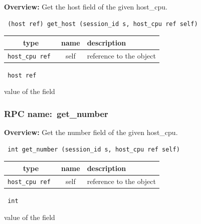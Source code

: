 {\bf Overview:} 
Get the host field of the given host\_cpu.

\begin{verbatim} (host ref) get_host (session_id s, host_cpu ref self)\end{verbatim}



 
\vspace{0.3cm}
\begin{tabular}{|c|c|p{7cm}|}
 \hline
{\bf type} & {\bf name} & {\bf description} \\ \hline
{\tt host\_cpu ref } & self & reference to the object \\ \hline 

\end{tabular}

\vspace{0.3cm}

{\tt 
host ref
}


value of the field
\vspace{0.3cm}
\vspace{0.3cm}
\vspace{0.3cm}
\subsubsection{RPC name:~get\_number}

{\bf Overview:} 
Get the number field of the given host\_cpu.

\begin{verbatim} int get_number (session_id s, host_cpu ref self)\end{verbatim}



 
\vspace{0.3cm}
\begin{tabular}{|c|c|p{7cm}|}
 \hline
{\bf type} & {\bf name} & {\bf description} \\ \hline
{\tt host\_cpu ref } & self & reference to the object \\ \hline 

\end{tabular}

\vspace{0.3cm}

{\tt 
int
}


value of the field
\vspace{0.3cm}
\vspace{0.3cm}
\vspace{0.3cm}
